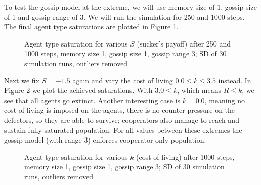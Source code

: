 \documentclass[english]{article}
\begin{document}
To test the gossip model at the extreme, we will use memory size of 1, gossip size of 1 and gossip range of 3.
We will run the simulation for 250 and 1000 steps.
The final agent type saturations are plotted in Figure \ref{fig:agent_sat/S_final}.

\begin{figure}[!h]
  \centering
  \caption{Agent type saturation for various $S$ (sucker's payoff) after 250 and 1000 steps, memory size 1, gossip size 1, gossip range 3; SD of 30 simulation runs, outliers removed}
  \label{fig:agent_sat/S_final}
\end{figure}

Next we fix $S = -1.5$ again and vary the cost of living $0.0 \leq k \leq 3.5$ instead.
In Figure \ref{fig:agent_sat/k_final} we plot the achieved saturations.
With $3.0 \leq k$, which means $R \leq k$, we see that all agents go extinct.
Another interesting case is $k = 0.0$, meaning no cost of living is imposed on the agents,
there is no counter pressure on the defectors, so they are able to survive; cooperators also manage to reach and sustain fully saturated population.
For all values between these extremes the gossip model (with range 3) enforces cooperator-only population.

\begin{figure}[!h]
  \centering
  \caption{Agent type saturation for various $k$ (cost of living) after 1000 steps, memory size 1, gossip size 1, gossip range 3; SD of 30 simulation runs, outliers removed}
  \label{fig:agent_sat/k_final}
\end{figure}
\end{document}
